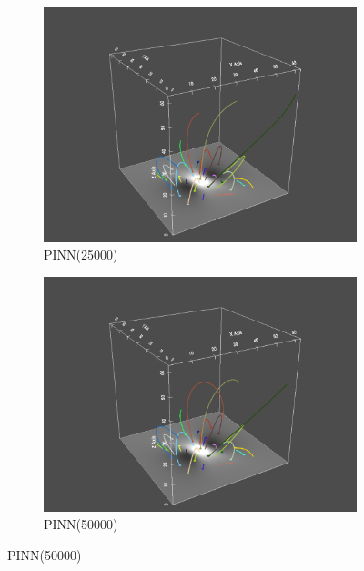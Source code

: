 \begin{figure}
  \begin{subfigure}{.5\linewidth}
    \centering
    \caption{PINN(25000)}
    \includegraphics[trim={6cm 0cm 6cm 3cm}, clip, width=\linewidth]{"img/PINN_025000_xz_tilted.pdf"}
  \end{subfigure}%
  \begin{subfigure}{.5\linewidth}
    \centering
    \caption{PINN(50000)}
    \includegraphics[trim={6cm 0cm 6cm 3cm}, clip, width=\linewidth]{"img/PINN_050000_xz_tilted.pdf"}
  \end{subfigure}
  

\end{figure}
